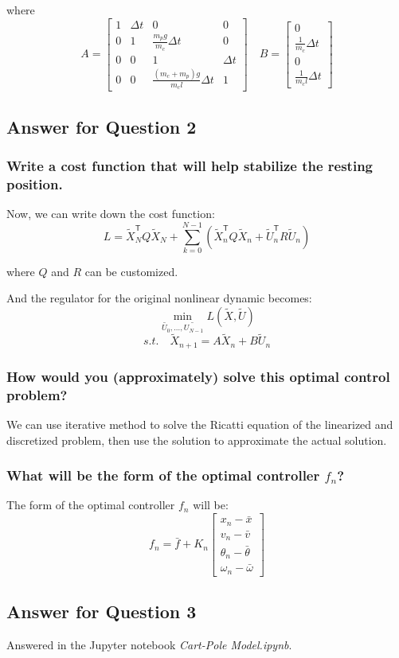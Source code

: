 where
\[
    A =
    \begin{bmatrix}
        1 & \Delta t & 0 & 0 \\
        0 & 1 & \frac{m_p g}{m_c} \Delta t & 0 \\
        0 & 0 & 1 & \Delta t \\
        0 & 0 & \frac{(m_c + m_p) g}{m_c l} \Delta t & 1
    \end{bmatrix}
    \quad
    B =
    \begin{bmatrix}
        0 \\
        \frac{1}{m_c} \Delta t \\
        0 \\
        \frac{1}{m_c l} \Delta t
    \end{bmatrix}
\]


\subsection*{Answer for Question 2}

\subsubsection*{Write a cost function that will help stabilize the resting position.}
Now, we can write down the cost function:
\[
    L = \tilde{X}_N^{\mathsf{T}} Q \tilde{X}_N + \sum_{k=0}^{N-1} (\tilde{X}_{n}^{\mathsf{T}} Q \tilde{X}_{n} + \tilde{U}_{n}^{\mathsf{T}} R \tilde{U}_{n})
\]

where \( Q \) and \( R \) can be customized.

And the regulator for the original nonlinear dynamic becomes:
\[
    \min_{\tilde{U_0}, \ldots, \tilde{U_{N-1}}} L(\tilde{X}, \tilde{U})
\]
\[
    s.t. \quad \tilde{X}_{n+1} = A \tilde{X}_n + B \tilde{U}_n
\]

\subsubsection*{How would you (approximately) solve this optimal control problem?}
We can use iterative method to solve the Ricatti equation of the linearized and discretized problem, then use the solution to approximate the actual solution.

\subsubsection*{What will be the form of the optimal controller $f_n$?}
The form of the optimal controller \(f_n\) will be:
\[
    f_n = \bar{f} + K_n
    \begin{bmatrix}
        x_n - \bar{x} \\
        v_n - \bar{v} \\
        \theta_n - \bar{\theta} \\
        \omega_n - \bar{\omega}
    \end{bmatrix}
\]


\subsection*{Answer for Question 3}
Answered in the Jupyter notebook \textit{Cart-Pole Model.ipynb}.
